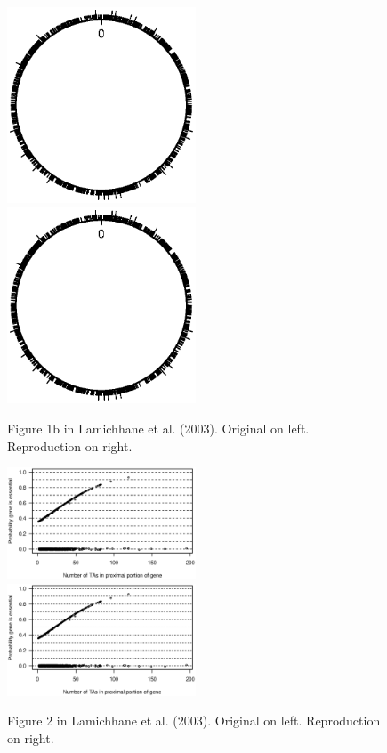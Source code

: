 \begin{figure}
\includegraphics[viewport=179 299 438 517, width=0.50\textwidth]{../talk/Figs/circlefig.ps}
\hfill
\includegraphics[viewport=179 299 438 517, width=0.50\textwidth]{../reproduction/Figs/circlefig.ps}

\caption{Figure 1b in Lamichhane et al. (2003). Original on left. Reproduction on right.\label{fig:fig1b}}
\end{figure}

\begin{figure}
\includegraphics[viewport=44 245 525 508, width=0.50\textwidth]{../original/Nov02/R/Figs/fig2.ps}
\hfill
\includegraphics[viewport=44 245 525 508, width=0.50\textwidth]{../reproduction/Figs/fig2.ps}

\caption{Figure 2 in Lamichhane et al. (2003). Original on left. Reproduction on right.\label{fig:fig2}}
\end{figure}


